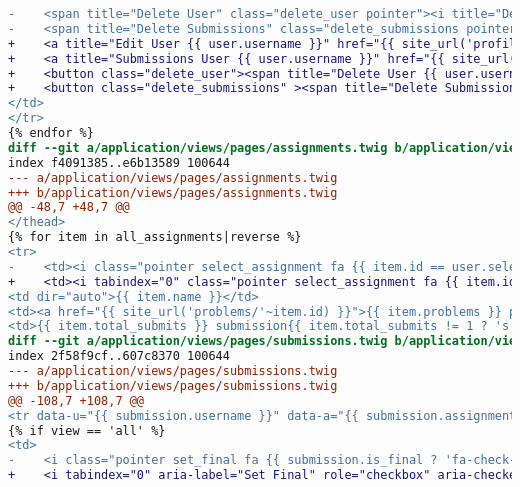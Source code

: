\begin{itemize}
\begin{lstlisting}[language=diff, caption=Perubahan untuk mematuhi kriteria 2.1.1, label=lst_2.1.1, basicstyle=\ttfamily, frame=single,
columns=fullflexible, keepspaces=true, breaklines=true]
-    <span title="Delete User" class="delete_user pointer"><i title="Delete User" class="fa fa-times fa-lg color2"></i></span>
-    <span title="Delete Submissions" class="delete_submissions pointer"><i class="fa fa-times-circle fa-lg color1"></i></span>
+    <a title="Edit User {{ user.username }}" href="{{ site_url('profile/'~user.id) }}"><i class="fa fa-pencil fa-lg color9"></i></a>
+    <a title="Submissions User {{ user.username }}" href="{{ site_url('submissions/all/user/'~user.username) }}"><i class="fa fa-bars fa-lg color12"></i></a>
+    <button class="delete_user"><span title="Delete User {{ user.username }}" class="pointer"><i title="Delete User" class="fa fa-times fa-lg color2"></i></span></button>
+    <button class="delete_submissions" ><span title="Delete Submissions {{ user.username }}" class="pointer"><i class="fa fa-times-circle fa-lg color1"></i></span></button>
</td>
</tr>
{% endfor %}
diff --git a/application/views/pages/assignments.twig b/application/views/pages/assignments.twig
index f4091385..e6b13589 100644
--- a/application/views/pages/assignments.twig
+++ b/application/views/pages/assignments.twig
@@ -48,7 +48,7 @@
</thead>
{% for item in all_assignments|reverse %}
<tr>
-    <td><i class="pointer select_assignment fa {{ item.id == user.selected_assignment.id ? 'fa-check-square-o color6' : 'fa-square-o' }} fa-2x" data-id="{{ item.id }}"></i></td>
+    <td><i tabindex="0" class="pointer select_assignment fa {{ item.id == user.selected_assignment.id ? 'fa-check-square-o color6' : 'fa-square-o' }} fa-2x" data-id="{{ item.id }}"></i></td>
<td dir="auto">{{ item.name }}</td>
<td><a href="{{ site_url('problems/'~item.id) }}">{{ item.problems }} problem{{ item.problems != 1 ? 's' }}</a></td>
<td>{{ item.total_submits }} submission{{ item.total_submits != 1 ? 's' }}</td>
diff --git a/application/views/pages/submissions.twig b/application/views/pages/submissions.twig
index 2f58f9cf..607c8370 100644
--- a/application/views/pages/submissions.twig
+++ b/application/views/pages/submissions.twig
@@ -108,7 +108,7 @@
<tr data-u="{{ submission.username }}" data-a="{{ submission.assignment }}" data-p="{{ submission.problem }}" data-s="{{ submission.submit_id }}" {% if view == 'final' and j is even %}class="hl"{% endif %}>
{% if view == 'all' %}
<td>
-    <i class="pointer set_final fa {{ submission.is_final ? 'fa-check-circle-o color11' : 'fa-circle-o' }} fa-2x"></i>
+    <i tabindex="0" aria-label="Set Final" role="checkbox" aria-checked="{{ submission.is_final ? 'true' : 'false' }}" class="pointer set_final fa {{ submission.is_final ? 'fa-check-circle-o color11' : 'fa-circle-o' }} fa-2x"></i>

\end{lstlisting}
\end{itemize}

